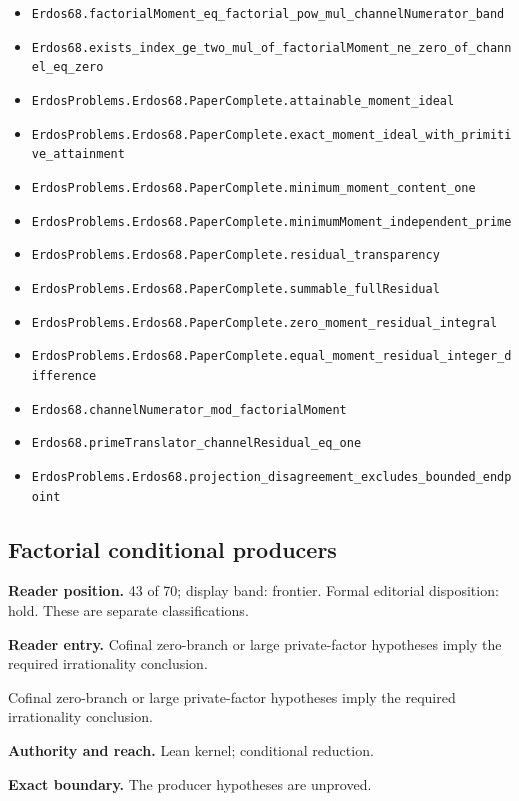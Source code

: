 \documentclass[11pt]{article}
\begin{document}
\begin{itemize}
  \item \nolinkurl{Erdos68.factorialMoment_eq_factorial_pow_mul_channelNumerator_band}
  \item \nolinkurl{Erdos68.exists_index_ge_two_mul_of_factorialMoment_ne_zero_of_channel_eq_zero}
  \item \nolinkurl{ErdosProblems.Erdos68.PaperComplete.attainable_moment_ideal}
  \item \nolinkurl{ErdosProblems.Erdos68.PaperComplete.exact_moment_ideal_with_primitive_attainment}
  \item \nolinkurl{ErdosProblems.Erdos68.PaperComplete.minimum_moment_content_one}
  \item \nolinkurl{ErdosProblems.Erdos68.PaperComplete.minimumMoment_independent_prime}
  \item \nolinkurl{ErdosProblems.Erdos68.PaperComplete.residual_transparency}
  \item \nolinkurl{ErdosProblems.Erdos68.PaperComplete.summable_fullResidual}
  \item \nolinkurl{ErdosProblems.Erdos68.PaperComplete.zero_moment_residual_integral}
  \item \nolinkurl{ErdosProblems.Erdos68.PaperComplete.equal_moment_residual_integer_difference}
  \item \nolinkurl{Erdos68.channelNumerator_mod_factorialMoment}
  \item \nolinkurl{Erdos68.primeTranslator_channelResidual_eq_one}
  \item \nolinkurl{ErdosProblems.Erdos68.projection_disagreement_excludes_bounded_endpoint}
\end{itemize}

\subsection{Factorial conditional producers}
\textbf{Reader position.} 43 of 70; display band: frontier.  Formal editorial disposition: hold.  These are separate classifications.

\textbf{Reader entry.} Cofinal zero-branch or large private-factor hypotheses imply the required irrationality conclusion.

Cofinal zero-branch or large private-factor hypotheses imply the required irrationality conclusion.

\textbf{Authority and reach.} Lean kernel; conditional reduction.

\textbf{Exact boundary.} The producer hypotheses are unproved.
\end{document}
